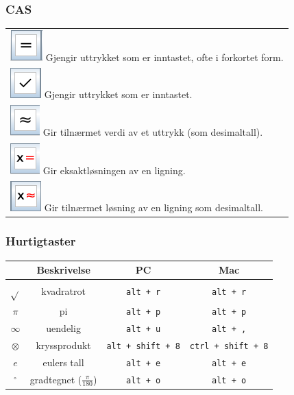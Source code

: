 \subsubsection*{CAS}
\begin{tabular}{@{}l}
	\;\includegraphics[scale=0.4]{fig/erlik} Gjengir uttrykket som er inntastet, ofte i forkortet form.\\	
	\;\includegraphics[scale=0.4]{fig/brin} Gjengir uttrykket som er inntastet.\\	
	\;\includegraphics[scale=0.4]{fig/caerlik} Gir tilnærmet verdi av et uttrykk (som desimaltall). \\	
	\;\includegraphics[scale=0.4]{fig/x} Gir eksaktløsningen av en ligning.\\
	\;\includegraphics[scale=0.4]{fig/xca} Gir tilnærmet løsning av en ligning som desimaltall.\\
	
\end{tabular}

\subsubsection{Hurtigtaster}
\begin{tabular}{@{}c | c |c | c }
	&\textbf{Beskrivelse} & \textbf{PC }& \textbf{Mac} \\ \hline
	$ \sqrt{} $	& kvadratrot& \texttt{alt\,+\,r} &\texttt{alt\,+\,r} \\\hline
	$ \pi $	& pi& \texttt{alt\,+\,p} & \texttt{alt\,+\,p}\\\hline
	$ \infty $ &uendelig& \texttt{alt\,+\,u} &\texttt{alt\,+\,,}  \\\hline
	$ \otimes $&kryssprodukt & \texttt{alt\,+\,shift\,+\,8}&\texttt{ctrl\,+\,shift\,+\,8} \\\hline
	$ e $&eulers tall & \texttt{alt\,+\,e}& \texttt{alt\,+\,e}\\\hline
	$ {}^\circ $&gradtegnet ($ \frac{\pi}{180} $) & \texttt{alt\,+\,o}& \texttt{alt\,+\,o}
	\\\hline	
\end{tabular}
\newpage
\label{commandliststart}
